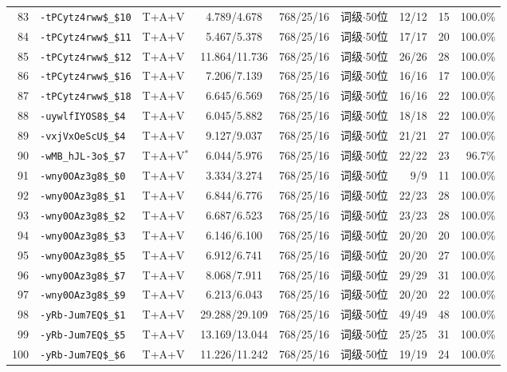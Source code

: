 \begin{longtable}{rllcccrrr}
83 & \texttt{-tPCytz4rww\$\_\$10} & T+A+V & 4.789/4.678 & 768/25/16 & 词级$\cdot$50位 & 12/12 & 15 & 100.0\% \\
84 & \texttt{-tPCytz4rww\$\_\$11} & T+A+V & 5.467/5.378 & 768/25/16 & 词级$\cdot$50位 & 17/17 & 20 & 100.0\% \\
85 & \texttt{-tPCytz4rww\$\_\$12} & T+A+V & 11.864/11.736 & 768/25/16 & 词级$\cdot$50位 & 26/26 & 28 & 100.0\% \\
86 & \texttt{-tPCytz4rww\$\_\$16} & T+A+V & 7.206/7.139 & 768/25/16 & 词级$\cdot$50位 & 16/16 & 17 & 100.0\% \\
87 & \texttt{-tPCytz4rww\$\_\$18} & T+A+V & 6.645/6.569 & 768/25/16 & 词级$\cdot$50位 & 16/16 & 22 & 100.0\% \\
88 & \texttt{-uywlfIYOS8\$\_\$4} & T+A+V & 6.045/5.882 & 768/25/16 & 词级$\cdot$50位 & 18/18 & 22 & 100.0\% \\
89 & \texttt{-vxjVxOeScU\$\_\$4} & T+A+V & 9.127/9.037 & 768/25/16 & 词级$\cdot$50位 & 21/21 & 27 & 100.0\% \\
90 & \texttt{-wMB\_hJL-3o\$\_\$7} & T+A+V$^{*}$ & 6.044/5.976 & 768/25/16 & 词级$\cdot$50位 & 22/22 & 23 & 96.7\% \\
91 & \texttt{-wny0OAz3g8\$\_\$0} & T+A+V & 3.334/3.274 & 768/25/16 & 词级$\cdot$50位 & 9/9 & 11 & 100.0\% \\
92 & \texttt{-wny0OAz3g8\$\_\$1} & T+A+V & 6.844/6.776 & 768/25/16 & 词级$\cdot$50位 & 22/23 & 28 & 100.0\% \\
93 & \texttt{-wny0OAz3g8\$\_\$2} & T+A+V & 6.687/6.523 & 768/25/16 & 词级$\cdot$50位 & 23/23 & 28 & 100.0\% \\
94 & \texttt{-wny0OAz3g8\$\_\$3} & T+A+V & 6.146/6.100 & 768/25/16 & 词级$\cdot$50位 & 20/20 & 20 & 100.0\% \\
95 & \texttt{-wny0OAz3g8\$\_\$5} & T+A+V & 6.912/6.741 & 768/25/16 & 词级$\cdot$50位 & 20/20 & 27 & 100.0\% \\
96 & \texttt{-wny0OAz3g8\$\_\$7} & T+A+V & 8.068/7.911 & 768/25/16 & 词级$\cdot$50位 & 29/29 & 31 & 100.0\% \\
97 & \texttt{-wny0OAz3g8\$\_\$9} & T+A+V & 6.213/6.043 & 768/25/16 & 词级$\cdot$50位 & 20/20 & 22 & 100.0\% \\
98 & \texttt{-yRb-Jum7EQ\$\_\$1} & T+A+V & 29.288/29.109 & 768/25/16 & 词级$\cdot$50位 & 49/49 & 48 & 100.0\% \\
99 & \texttt{-yRb-Jum7EQ\$\_\$5} & T+A+V & 13.169/13.044 & 768/25/16 & 词级$\cdot$50位 & 25/25 & 31 & 100.0\% \\
100 & \texttt{-yRb-Jum7EQ\$\_\$6} & T+A+V & 11.226/11.242 & 768/25/16 & 词级$\cdot$50位 & 19/19 & 24 & 100.0\% \\
\bottomrule
\end{longtable}
\endgroup

\FloatBarrier
